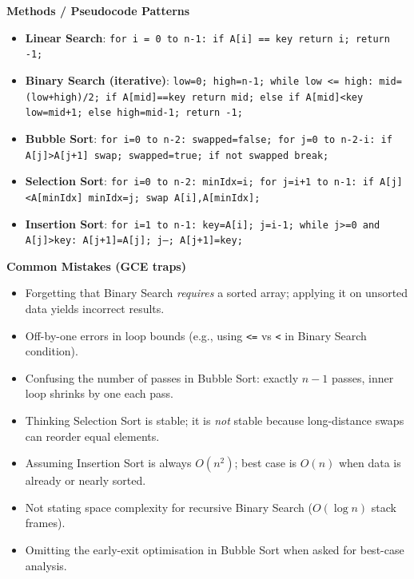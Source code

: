 \documentclass[11pt]{article}
\begin{document}
\begin{bilan}
\textbf{Methods / Pseudocode Patterns}
\begin{itemize}
\item \textbf{Linear Search}: \texttt{for i = 0 to n-1: if A[i] == key return i; return -1;}
\item \textbf{Binary Search (iterative)}: \texttt{low=0; high=n-1; while low <= high: mid=(low+high)/2; if A[mid]==key return mid; else if A[mid]<key low=mid+1; else high=mid-1; return -1;}
\item \textbf{Bubble Sort}: \texttt{for i=0 to n-2: swapped=false; for j=0 to n-2-i: if A[j]>A[j+1] swap; swapped=true; if not swapped break;}
\item \textbf{Selection Sort}: \texttt{for i=0 to n-2: minIdx=i; for j=i+1 to n-1: if A[j]<A[minIdx] minIdx=j; swap A[i],A[minIdx];}
\item \textbf{Insertion Sort}: \texttt{for i=1 to n-1: key=A[i]; j=i-1; while j>=0 and A[j]>key: A[j+1]=A[j]; j--; A[j+1]=key;}
\end{itemize}

\textbf{Common Mistakes (GCE traps)}
\begin{itemize}
\item Forgetting that Binary Search \emph{requires} a sorted array; applying it on unsorted data yields incorrect results.
\item Off-by-one errors in loop bounds (e.g., using \texttt{<=} vs \texttt{<} in Binary Search condition).
\item Confusing the number of passes in Bubble Sort: exactly $n-1$ passes, inner loop shrinks by one each pass.
\item Thinking Selection Sort is stable; it is \emph{not} stable because long-distance swaps can reorder equal elements.
\item Assuming Insertion Sort is always $O(n^2)$; best case is $O(n)$ when data is already or nearly sorted.
\item Not stating space complexity for recursive Binary Search ($O(\log n)$ stack frames).
\item Omitting the early-exit optimisation in Bubble Sort when asked for best-case analysis.
\end{itemize}


\end{bilan}
\end{document}

